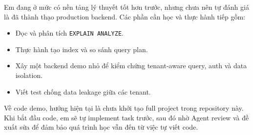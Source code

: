 \documentclass[12pt,a4paper]{article}
\begin{document}
    Em đang ở mức có nền tảng lý thuyết tốt hơn trước, nhưng chưa nên tự đánh giá là đã thành thạo production backend. Các phần cần học và thực hành tiếp gồm:

    \begin{itemize}[leftmargin=*]
    \item Đọc và phân tích \texttt{EXPLAIN ANALYZE}.
    \item Thực hành tạo index và so sánh query plan.
    \item Xây một backend demo nhỏ để kiểm chứng tenant-aware query, auth và data isolation.
    \item Viết test chống data leakage giữa các tenant.
    \end{itemize}

    Về code demo, hướng hiện tại là chưa khởi tạo full project trong repository này. Khi bắt đầu code, em sẽ tự implement task trước, sau đó nhờ Agent review và đề xuất sửa để đảm bảo quá trình học vẫn đến từ việc tự viết code.
\end{document}
